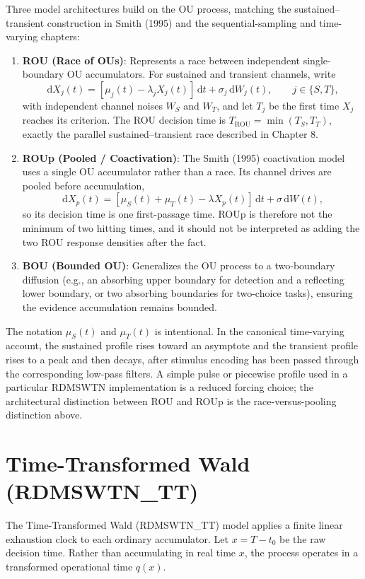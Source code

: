 \documentclass[12pt]{article}
\newcommand{\dd}{\,\mathrm{d}}
\begin{document}
Three model architectures build on the OU process, matching the sustained-- transient construction in Smith (1995) and the sequential-sampling and time-varying chapters:
\begin{enumerate}
  \item \textbf{ROU (Race of OUs)}: Represents a race between independent single-boundary OU accumulators. For sustained and transient channels, write
  \begin{equation}
    \dd X_j(t)=\left[\mu_j(t)-\lambda_jX_j(t)\right]\dd t+\sigma_j\dd W_j(t),
    \qquad j\in\{S,T\},
  \end{equation}
  with independent channel noises $W_S$ and $W_T$, and let $T_j$ be the first time $X_j$ reaches its criterion. The ROU decision time is $T_{\mathrm{ROU}}=\min(T_S,T_T)$, exactly the parallel sustained--transient race described in Chapter 8.
  \item \textbf{ROUp (Pooled / Coactivation)}: The Smith (1995) coactivation model uses a single OU accumulator rather than a race. Its channel drives are pooled before accumulation,
  \begin{equation}
    \dd X_p(t)=\left[\mu_S(t)+\mu_T(t)-\lambda X_p(t)\right]\dd t+\sigma\dd W(t),
  \end{equation}
  so its decision time is one first-passage time. ROUp is therefore not the minimum of two hitting times, and it should not be interpreted as adding the two ROU response densities after the fact.
  \item \textbf{BOU (Bounded OU)}: Generalizes the OU process to a two-boundary diffusion (e.g., an absorbing upper boundary for detection and a reflecting lower boundary, or two absorbing boundaries for two-choice tasks), ensuring the evidence accumulation remains bounded.
\end{enumerate}

The notation $\mu_S(t)$ and $\mu_T(t)$ is intentional. In the canonical time-varying account, the sustained profile rises toward an asymptote and the transient profile rises to a peak and then decays, after stimulus encoding has been passed through the corresponding low-pass filters. A simple pulse or piecewise profile used in a particular RDMSWTN implementation is a reduced forcing choice; the architectural distinction between ROU and ROUp is the race-versus-pooling distinction above.

\section{Time-Transformed Wald (RDMSWTN\_TT)}
The Time-Transformed Wald (RDMSWTN\_TT) model applies a finite linear exhaustion clock to each ordinary accumulator. Let $x = T - t_0$ be the raw decision time. Rather than accumulating in real time $x$, the process operates in a transformed operational time $q(x)$.
\end{document}

